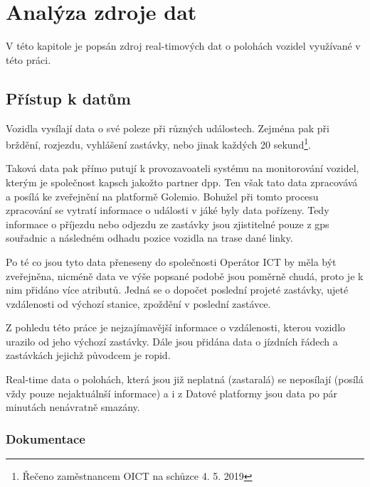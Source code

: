 \section{Analýza zdroje dat} \label{section:analyza_zdroje}

V této kapitole je popsán zdroj real-timových dat o polohách vozidel využívané v této práci.

\subsection{Přístup k datům}

Vozidla vysílají data o své poleze při různých událostech. Zejména pak při brždění, rozjezdu, vyhlášení zastávky, nebo jinak každých 20 sekund\footnote{Řečeno zaměstnancem OICT na schůzce 4. 5. 2019}.

\bigbreak

Taková data pak přímo putují k provozavoateli systému na monitorování vozidel, kterým je společnost \gls{kapsch} jakožto partner \gls{dpp}. Ten však tato data zpracovává a posílá ke zveřejnění na platformě Golemio. Bohužel při tomto procesu zpracování se vytratí informace o události v jáké byly data pořízeny. Tedy informace o příjezdu nebo odjezdu ze zastávky jsou zjistitelné pouze z \gls{gps} souřadnic a následném odhadu pozice vozidla na trase dané linky.

\bigbreak

Po té co jsou tyto data přeneseny do společnosti Operátor ICT by měla být zveřejněna, nicméně data ve výše popsané podobě jsou poměrně chudá, proto je k nim přidáno více atributů. Jedná se o dopočet poslední projeté zastávky, ujeté vzdálenosti od výchozí stanice, zpoždění v poslední zastávce.

\bigbreak

 Z pohledu této práce je nejzajímavější informace o vzdálenosti, kterou vozidlo urazilo od jeho výchozí zastávky. Dále jsou přidána data o jízdních řádech a zastávkách jejichž původcem je \gls{ropid}.

\bigbreak

Real-time data o polohách, která jsou již neplatná (zastaralá) se neposílají (posílá vždy pouze nejaktuálnší informace) a i z Datové platformy jsou data po pár minutách nenávratně smazány.

\subsubsection{Dokumentace}

